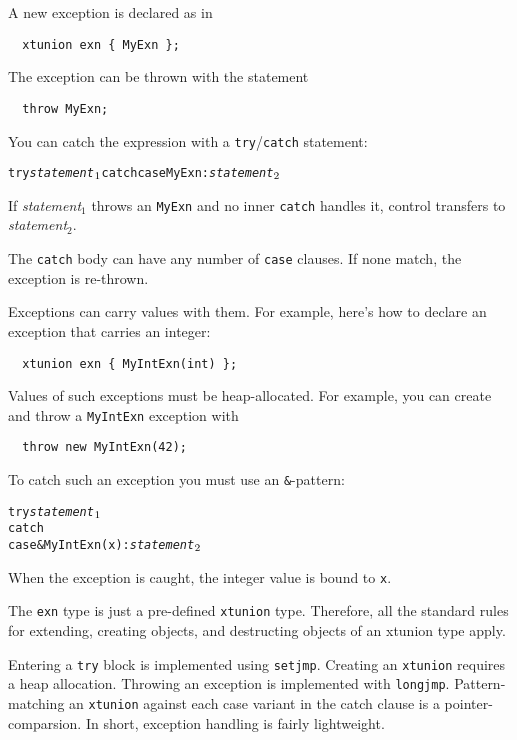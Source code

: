 
A new exception is declared as in 
\begin{verbatim}
  xtunion exn { MyExn };
\end{verbatim}
The exception can be thrown with the statement
\begin{verbatim}
  throw MyExn;
\end{verbatim}
You can catch the expression with a \texttt{try}/\texttt{catch}
statement:
\begin{alltt}
  try {\it statement}\(\sb{1}\) catch \lb case MyExn: {\it statement}\(\sb{2}\) \rb
\end{alltt}
If {\it statement}$_1$ throws an \texttt{MyExn} and no inner
\texttt{catch} handles it, control transfers to 
{\it statement}$_2$.

The \texttt{catch} body can have any number of \texttt{case} clauses.
If none match, the exception is re-thrown.

Exceptions can carry values with them.  For example, here's how to
declare an exception that carries an integer:
\begin{verbatim}
  xtunion exn { MyIntExn(int) };
\end{verbatim}
Values of such exceptions must be heap-allocated.  For example, you
can create and throw a \texttt{MyIntExn} exception with
\begin{verbatim}
  throw new MyIntExn(42);
\end{verbatim}
To catch such an exception you must use an \texttt{\&}-pattern:
\begin{alltt}
  try {\it statement}\(\sb{1}\)
  catch \lb
    case &MyIntExn(x): {\it statement}\(\sb{2}\)
  \rb
\end{alltt}
When the exception is caught, the integer value is bound to \texttt{x}.

The \texttt{exn} type is just a pre-defined \texttt{xtunion} type.
Therefore, all the standard rules for extending, creating objects, and
destructing objects of an xtunion type apply.


Entering a \texttt{try} block is implemented using \texttt{setjmp}.
Creating an \texttt{xtunion} requires a heap allocation.  Throwing an
exception is implemented with \texttt{longjmp}.  Pattern-matching an
\texttt{xtunion} against each case variant in the catch clause is a
pointer-comparsion.  In short, exception handling is fairly
lightweight.

